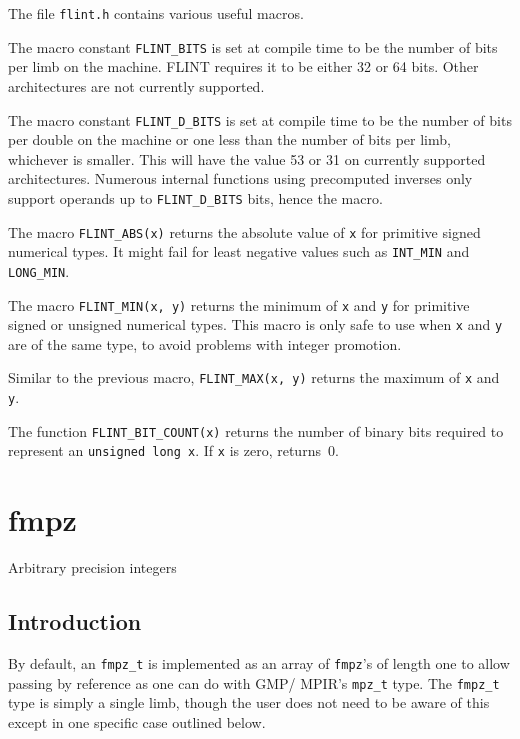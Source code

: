 \documentclass[a4paper,10pt]{book}
\newcommand{\code}{\lstinline}
\begin{document}
The file \code{flint.h} contains various useful macros.

The macro constant \code{FLINT_BITS} is set at compile time to be the 
number of bits per limb on the machine.  FLINT requires it to be either 
32 or 64 bits.  Other architectures are not currently supported.

The macro constant \code{FLINT_D_BITS} is set at compile time to be the 
number of bits per double on the machine or one less than the number of 
bits per limb, whichever is smaller.  This will have the value 53 or 31 
on currently supported architectures.  Numerous internal functions using 
precomputed inverses only support operands up to \code{FLINT_D_BITS} bits, 
hence the macro.

The macro \code{FLINT_ABS(x)} returns the absolute value of \code{x}
for primitive signed numerical types.  It might fail for least negative 
values such as \code{INT_MIN} and \code{LONG_MIN}.

The macro \code{FLINT_MIN(x, y)} returns the minimum of \code{x} and 
\code{y} for primitive signed or unsigned numerical types.  This macro 
is only safe to use when \code{x} and \code{y} are of the same type, 
to avoid problems with integer promotion.

Similar to the previous macro, \code{FLINT_MAX(x, y)} returns the 
maximum of \code{x} and \code{y}.

The function \code{FLINT_BIT_COUNT(x)} returns the number of binary bits 
required to represent an \code{unsigned long x}.  If \code{x} is zero, 
returns~$0$.


\chapter{fmpz}
\epigraph{Arbitrary precision integers}{}

\section{Introduction}

By default, an \code{fmpz_t} is implemented as an array of \code{fmpz}'s of 
length one to allow passing by reference as one can do with GMP/ MPIR's 
\code{mpz_t} type.  The \code{fmpz_t} type is simply a single limb, though 
the user does not need to be aware of this except in one specific case 
outlined below.
\end{document}
